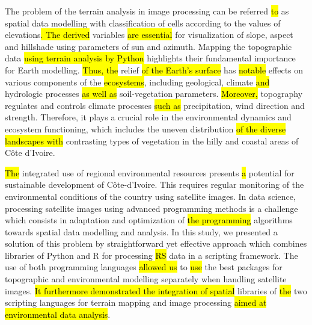 \documentclass[jimaging,article,submit,pdftex,moreauthors]{Definitions/mdpi}
\begin{document}
The problem of the terrain analysis in image processing can be referred \hl{to }as spatial data modelling with classification of cells according to the values of elevations\hl{. The derived} variables \hl{are essential }for visualization of slope, aspect and hillshade using parameters of sun and azimuth. 
Mapping the topographic data \hl{using terrain analysis by Python }highlights their fundamental importance for Earth modelling. \hl{Thus, the }relief \hl{of the Earth's surface }has \hl{notable }effects on various components of the \hl{ecosystems}, including\hl{ }geological, climate \hl{and} hydrologic processes \hl{as well as} soil-vegetation parameters. \hl{Moreover, }topography regulates and controls climate processes \hl{such as }precipitation, wind direction and strength. Therefore, it plays a crucial role in the environmental dynamics and ecosystem functioning, which includes the uneven distribution\hl{ of the diverse landscapes with }contrasting types of vegetation in the hilly and coastal areas of Côte d'Ivoire. 

\hl{The }integrated use of regional environmental resources presents \hl{a} potential for sustainable development of Côte-d'Ivoire. This requires regular monitoring of the environmental conditions of the country using satellite images. In data science, processing satellite images using advanced programming methods is a challenge which consists in adaptation and optimization of \hl{the programming }algorithms towards spatial data modelling and analysis. In this study, we presented a solution of this problem by straightforward yet effective approach which combines libraries of Python and R for processing \hl{RS} data in a scripting framework. The use of both programming languages\hl{ allowed us} to \hl{use} the best packages for topographic and environmental modelling separately when handling satellite images. \hl{It furthermore demonstrated the integration of spatial} libraries of \hl{the }two scripting languages\hl{ }for\hl{ }terrain mapping and\hl{ }image processing \hl{aimed at environmental data analysis}. 
\end{document}
